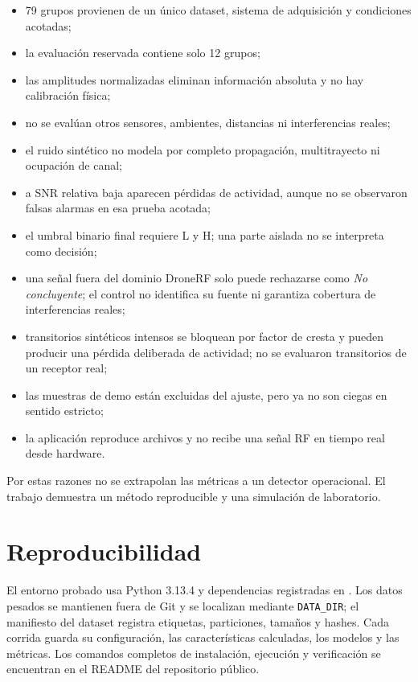 \documentclass[11pt,a4paper]{article}
\begin{document}
\begin{itemize}
  \item 79 grupos provienen de un único dataset, sistema de adquisición y condiciones acotadas;
  \item la evaluación reservada contiene solo 12 grupos;
  \item las amplitudes normalizadas eliminan información absoluta y no hay calibración física;
  \item no se evalúan otros sensores, ambientes, distancias ni interferencias reales;
  \item el ruido sintético no modela por completo propagación, multitrayecto ni ocupación de canal;
  \item a SNR relativa baja aparecen pérdidas de actividad, aunque no se observaron falsas alarmas en esa prueba acotada;
  \item el umbral binario final requiere L y H; una parte aislada no se interpreta como decisión;
  \item una señal fuera del dominio DroneRF solo puede rechazarse como \emph{No concluyente};
        el control no identifica su fuente ni garantiza cobertura de interferencias reales;
  \item transitorios sintéticos intensos se bloquean por factor de cresta y pueden producir
        una pérdida deliberada de actividad; no se evaluaron transitorios de un receptor real;
  \item las muestras de demo están excluidas del ajuste, pero ya no son ciegas en sentido estricto;
  \item la aplicación reproduce archivos y no recibe una señal RF en tiempo real desde hardware.
\end{itemize}

Por estas razones no se extrapolan las métricas a un detector operacional. El trabajo
demuestra un método reproducible y una simulación de laboratorio.

\section{Reproducibilidad}

El entorno probado usa Python 3.13.4 y dependencias registradas en
. Los datos pesados se mantienen fuera de Git y se localizan
mediante \texttt{DATA\_DIR}; el manifiesto del dataset registra etiquetas, particiones,
tamaños y hashes. Cada corrida guarda su configuración, las características calculadas,
los modelos y las métricas. Los comandos completos de instalación, ejecución y verificación
se encuentran en el README del repositorio público.
\end{document}
